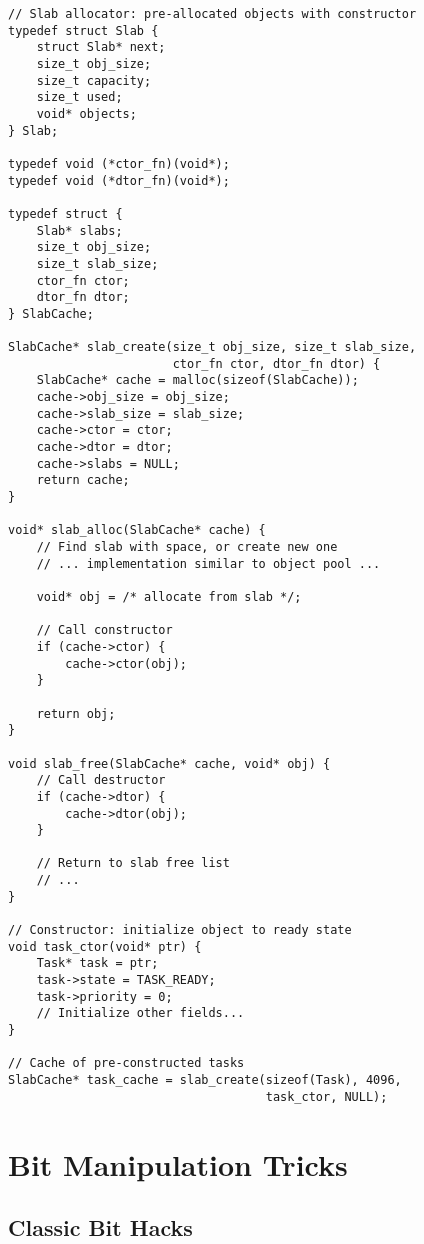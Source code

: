 \begin{lstlisting}
// Slab allocator: pre-allocated objects with constructor
typedef struct Slab {
    struct Slab* next;
    size_t obj_size;
    size_t capacity;
    size_t used;
    void* objects;
} Slab;

typedef void (*ctor_fn)(void*);
typedef void (*dtor_fn)(void*);

typedef struct {
    Slab* slabs;
    size_t obj_size;
    size_t slab_size;
    ctor_fn ctor;
    dtor_fn dtor;
} SlabCache;

SlabCache* slab_create(size_t obj_size, size_t slab_size,
                       ctor_fn ctor, dtor_fn dtor) {
    SlabCache* cache = malloc(sizeof(SlabCache));
    cache->obj_size = obj_size;
    cache->slab_size = slab_size;
    cache->ctor = ctor;
    cache->dtor = dtor;
    cache->slabs = NULL;
    return cache;
}

void* slab_alloc(SlabCache* cache) {
    // Find slab with space, or create new one
    // ... implementation similar to object pool ...

    void* obj = /* allocate from slab */;

    // Call constructor
    if (cache->ctor) {
        cache->ctor(obj);
    }

    return obj;
}

void slab_free(SlabCache* cache, void* obj) {
    // Call destructor
    if (cache->dtor) {
        cache->dtor(obj);
    }

    // Return to slab free list
    // ...
}

// Constructor: initialize object to ready state
void task_ctor(void* ptr) {
    Task* task = ptr;
    task->state = TASK_READY;
    task->priority = 0;
    // Initialize other fields...
}

// Cache of pre-constructed tasks
SlabCache* task_cache = slab_create(sizeof(Task), 4096,
                                    task_ctor, NULL);
\end{lstlisting}

\section{Bit Manipulation Tricks}

\subsection{Classic Bit Hacks}

